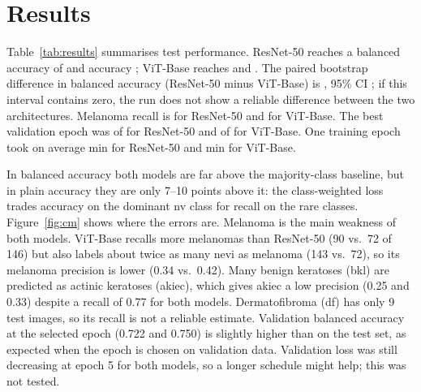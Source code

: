 \section{Results}
\label{sec:results}

\begin{table}[h]
\centering
\caption{Test-set results of the checkpoint with the best validation balanced accuracy ($n=\nTest$ images). Bal.\ acc.\ = balanced accuracy; min/ep.\ = mean training time per epoch on the laptop GPU.}
\label{tab:results}
\end{table}

\begin{table}[h]
\centering
\caption{Per-class recall on the test set; $n$ is the number of test images per class.}
\label{tab:perclass}
\end{table}

Table~\ref{tab:results} summarises test performance.
ResNet-50 reaches a balanced accuracy of \resnetTestBacc{} \resnetTestBaccCI{} and accuracy \resnetTestAcc{}; ViT-Base reaches \vitTestBacc{} \vitTestBaccCI{} and \vitTestAcc{}.
The paired bootstrap difference in balanced accuracy (ResNet-50 minus ViT-Base) is \baccDiff{}, 95\% CI \baccDiffCI{}; if this interval contains zero, the run does not show a reliable difference between the two architectures.
Melanoma recall is \resnetMelRecall{} for ResNet-50 and \vitMelRecall{} for ViT-Base.
The best validation epoch was \resnetBestEpoch{} of \resnetEpochs{} for ResNet-50 and \vitBestEpoch{} of \vitEpochs{} for ViT-Base.
One training epoch took on average \resnetMinPerEpoch{} min for ResNet-50 and \vitMinPerEpoch{} min for ViT-Base.

In balanced accuracy both models are far above the majority-class baseline, but in plain accuracy they are only 7--10 points above it: the class-weighted loss trades accuracy on the dominant nv class for recall on the rare classes.
Figure~\ref{fig:cm} shows where the errors are.
Melanoma is the main weakness of both models.
ViT-Base recalls more melanomas than ResNet-50 (90 vs.\ 72 of 146) but also labels about twice as many nevi as melanoma (143 vs.\ 72), so its melanoma precision is lower (0.34 vs.\ 0.42).
Many benign keratoses (bkl) are predicted as actinic keratoses (akiec), which gives akiec a low precision (0.25 and 0.33) despite a recall of 0.77 for both models.
Dermatofibroma (df) has only 9 test images, so its recall is not a reliable estimate.
Validation balanced accuracy at the selected epoch (0.722 and 0.750) is slightly higher than on the test set, as expected when the epoch is chosen on validation data.
Validation loss was still decreasing at epoch 5 for both models, so a longer schedule might help; this was not tested.

